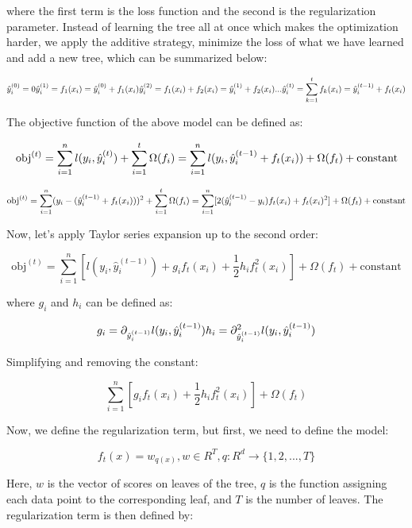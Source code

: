 where the first term is the loss function and the second is the regularization parameter. Instead of learning the tree all at once which makes the optimization harder, we apply the additive strategy, minimize the loss of what we have learned and add a new tree, which can be summarized below:

\[
\hat{y}_i^{(0)} = 0 \\
\hat{y}_i^{(1)} = f_1(x_i) = \hat{y}_i^{(0)} + f_1(x_i) \\
\hat{y}_i^{(2)} = f_1(x_i) + f_2(x_i) = \hat{y}_i^{(1)} + f_2(x_i) \\
... \\
\hat{y}_i^{(t)} = \sum_{k=1}^t f_k(x_i) = \hat{y}_i^{(t-1)} + f_t(x_i)
\]

The objective function of the above model can be defined as:

\[
\text{obj}^{(t)}  = \sum_{i=1}^{n} l(y_i, \hat{y}_{i}^{(t)}) + \sum_{i=1}^t\Omega(f_i) \\
= \sum_{i=1}^{n} l(y_i, \hat{y}_{i}^{(t-1)} + f_{t}(x_i)) + \Omega(f_t) + \text{constant}
\]

\[
\text{obj}^{(t)}  = \sum_{i=1}^n (y_{i} - (\hat{y}_{i}^{(t-1)} + f_t(x_i)))^2 + \sum_{i=1}^t\Omega(f_i) \\
= \sum_{i=1}^n [2(\hat{y}_i^{(t-1)} - y_i)f_t(x_i) + f_t(x_i)^2] + \Omega(f_t) + \text{constant}
\]

Now, let’s apply Taylor series expansion up to the second order:

\[
\text{obj}^{(t)} = \sum_{i=1}^{n} [l(y_i, \hat{y}_i^{(t-1)}) + g_i f_t(x_i) + \frac{1}{2} h_{i} f_{t}^2(x_i)] + \Omega(f_t) + \text{constant}
\]

where \(g_i\) and \(h_i\) can be defined as:

\[
g_i = \partial_{\hat{y}_i^{(t-1)}} l(y_i, \hat{y}_i^{(t-1)}) \\
h_i = \partial_{\hat{y}_i^{(t-1)}}^2 l(y_i, \hat{y}_i^{(t-1)})
\]

Simplifying and removing the constant:

\[
\sum_{i=1}^n [g_{i} f_{t}(x_i) + \frac{1}{2} h_{i} f_{t}^2(x_i)] + \Omega(f_t)
\]

Now, we define the regularization term, but first, we need to define the model:

\[
f_t(x) = w_{q(x)}, w \in R^{T}, q:R^d\rightarrow \{1,2,...,T\}
\]

Here, \(w\) is the vector of scores on leaves of the tree, \(q\) is the function assigning each data point to the corresponding leaf, and \(T\) is the number of leaves. The regularization term is then defined by:

